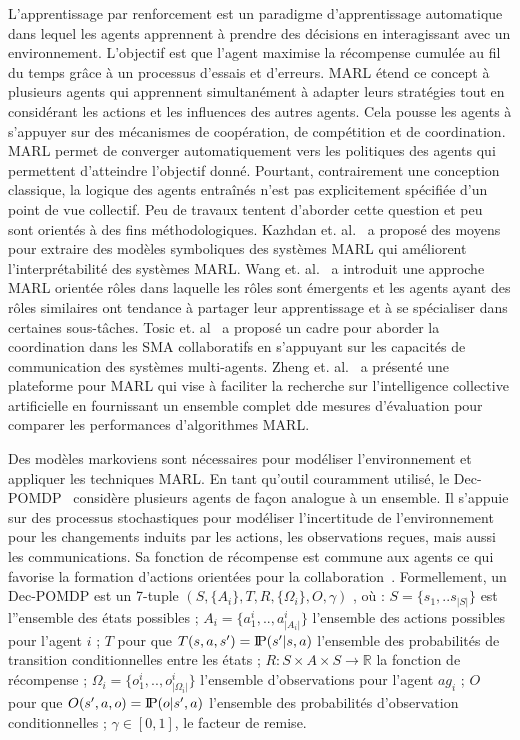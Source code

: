 \documentclass[contribution]{jfsma}
\newcommand{\probP}{\text{I\kern-0.15em P}}
\begin{document}
L'apprentissage par renforcement est un paradigme d'apprentissage automatique dans lequel les agents apprennent à prendre des décisions en interagissant avec un environnement. L’objectif est que l’agent maximise la récompense cumulée au fil du temps grâce à un processus d’essais et d’erreurs.
MARL étend ce concept à plusieurs agents qui apprennent simultanément à adapter leurs stratégies tout en considérant les actions et les influences des autres agents. Cela pousse les agents à s’appuyer sur des mécanismes de coopération, de compétition et de coordination.
MARL permet de converger automatiquement vers les politiques des agents qui permettent d'atteindre l'objectif donné. Pourtant, contrairement une conception classique, la logique des agents entraînés n'est pas explicitement spécifiée d'un point de vue collectif. Peu de travaux tentent d’aborder cette question et peu sont orientés à des fins méthodologiques.
Kazhdan et. al.~\cite{Kazhdan2020} a proposé des moyens pour extraire des modèles symboliques des systèmes MARL qui améliorent l'interprétabilité des systèmes MARL.
Wang et. al.~\cite{Wang2020} a introduit une approche MARL orientée rôles dans laquelle les rôles sont émergents et les agents ayant des rôles similaires ont tendance à partager leur apprentissage et à se spécialiser dans certaines sous-tâches.
Tosic et. al~\cite{Tosic2010} a proposé un cadre pour aborder la coordination dans les SMA collaboratifs en s'appuyant sur les capacités de communication des systèmes multi-agents.
Zheng et. al.~\cite{Zheng2018} a présenté une plateforme pour MARL qui vise à faciliter la recherche sur l'intelligence collective artificielle en fournissant un ensemble complet dde mesures d'évaluation pour comparer les performances d'algorithmes MARL.

Des modèles markoviens sont nécessaires pour modéliser l'environnement et appliquer les techniques MARL. En tant qu'outil couramment utilisé, le Dec-POMDP~\cite{Oliehoek2016} considère plusieurs agents de façon analogue à un ensemble. Il s'appuie sur des processus stochastiques pour modéliser l'incertitude de l'environnement pour les changements induits par les actions, les observations reçues, mais aussi les communications. Sa fonction de récompense est commune aux agents ce qui favorise la formation d'actions orientées pour la collaboration~\cite{Beynier2013}. Formellement, un Dec-POMDP est un 7-tuple $(S,\{A_i\},T,R,\{\Omega_i\},O,\gamma)$ , où : $S = \{s_1, .. s_{|S|}\}$ est l''ensemble des états possibles ; $A_{i} = \{a_{1}^{i},..,a_{|A_{i}|}^{i}\}$ l'ensemble des actions possibles pour l'agent $i$ ; $T$ pour que $T(s,a,s') = \probP{(s'|s,a)}$ l'ensemble des probabilités de transition conditionnelles entre les états ; $R : S \times A \times S \rightarrow \mathbb{R}$ la fonction de récompense ; $\Omega_{i} = \{o_{1}^{i},..,o_{|\Omega_{i}|}^{i}\}$  l'ensemble d'observations pour l'agent $ag_i$ ; $O$ pour que $O(s',a,o) = \probP{(o|s',a)}$  l'ensemble des probabilités d'observation conditionnelles ; $\gamma \in [0,1]$, le facteur de remise.
\end{document}
